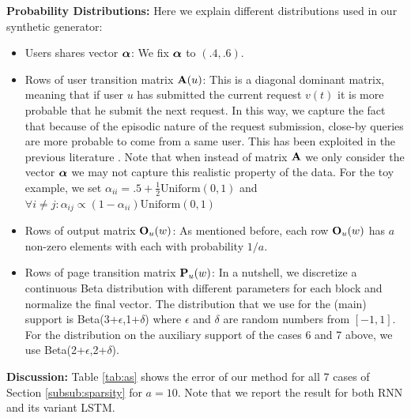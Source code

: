 	{\bf Probability Distributions:}
	\label{subsub:dist}
	Here we explain different distributions used in our synthetic generator:
	\begin{itemize}
		\item {Users shares vector $\aalpha$:} We fix $\aalpha$ to $(.4, .6)$.
		
		\item {Rows of user transition matrix $\A(u)$:} This is a diagonal dominant matrix, meaning that if user $u$ has submitted the current request $v(t)$ it is more probable that he submit the next request. 
		In this way, we capture the fact that because of the episodic nature of the request submission, close-by queries are more probable to come from a same user. 
		This has been exploited in the previous literature \cite{sigcomm}. Note that when instead of matrix $\A$ we only consider the vector $\aalpha$ we may not capture this realistic property of the data.
		For the toy example, we set $\alpha_{ii} = .5 + \frac{1}{2} \text{Uniform}(0,1)$ and $\forall i \neq j: \alpha_{ij} \propto (1 - \alpha_{ii}) \text{Uniform}(0,1)$
		
		\item {Rows of output matrix $\O_u(w)$:} As mentioned before, each row $\O_u(w)$ has $a$ non-zero elements with each with probability $1/a$.
		
		\item {Rows of page transition matrix $\P_u(w)$:} In a nutshell, we discretize a continuous Beta distribution with different parameters for each block and normalize the final vector.
		The distribution that we use for the (main) support is Beta(3+$\epsilon$,1+$\delta$) where $\epsilon$ and $\delta$ are random numbers from $[-1, 1]$. 
		For the distribution on the auxiliary support of the cases 6 and 7 above, we use Beta(2+$\epsilon$,2+$\delta$).
	\end{itemize}
	
	
	
	{\bf Discussion:}
	Table \ref{tab:as} shows the error of our method for all 7 cases of Section \ref{subsub:sparsity} for $a = 10$. 
	Note that we report the result for both RNN and its variant LSTM. 
	
